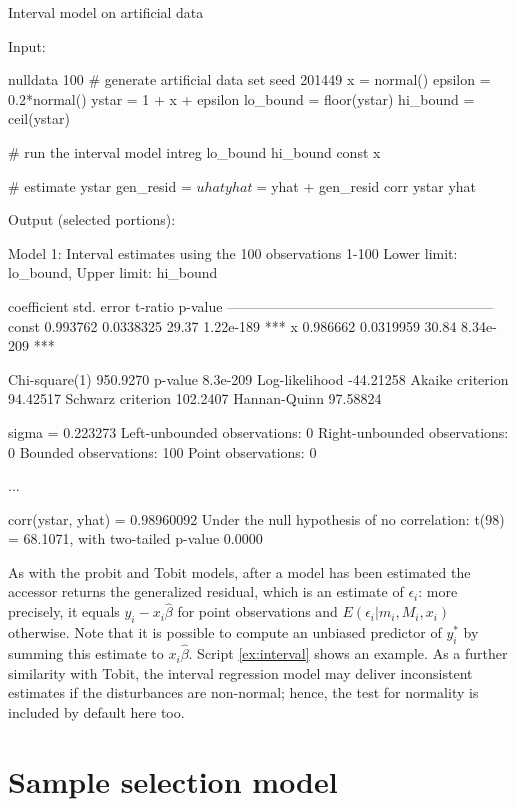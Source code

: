 \begin{script}[ht]
  \caption{Interval model on artificial data}
  \label{ex:interval}
Input:
\begin{scodebit}
nulldata 100
# generate artificial data
set seed 201449 
x = normal()
epsilon = 0.2*normal()
ystar = 1 + x + epsilon
lo_bound = floor(ystar)
hi_bound = ceil(ystar)

# run the interval model
intreg lo_bound hi_bound const x

# estimate ystar
gen_resid = $uhat
yhat = $yhat + gen_resid
corr ystar yhat 
\end{scodebit}
Output (selected portions):
\begin{scodebit}
Model 1: Interval estimates using the 100 observations 1-100
Lower limit: lo_bound, Upper limit: hi_bound

             coefficient   std. error   t-ratio    p-value 
  ---------------------------------------------------------
  const       0.993762     0.0338325     29.37    1.22e-189 ***
  x           0.986662     0.0319959     30.84    8.34e-209 ***

Chi-square(1)        950.9270   p-value              8.3e-209
Log-likelihood      -44.21258   Akaike criterion     94.42517
Schwarz criterion    102.2407   Hannan-Quinn         97.58824

sigma = 0.223273
Left-unbounded observations: 0
Right-unbounded observations: 0
Bounded observations: 100
Point observations: 0

...

corr(ystar, yhat) = 0.98960092
Under the null hypothesis of no correlation:
 t(98) = 68.1071, with two-tailed p-value 0.0000
\end{scodebit}
\end{script}

As with the probit and Tobit models, after a model has been estimated
the  accessor returns the generalized residual, which is
an estimate of $\epsilon_i$: more precisely, it equals $y_i - x_i
\hat{\beta}$ for point observations and $E(\epsilon_i| m_i, M_i, x_i)$
otherwise. Note that it is possible to compute an unbiased predictor
of $y^*_i$ by summing this estimate to $x_i \hat{\beta}$. Script
\ref{ex:interval} shows an example. As a further similarity with
Tobit, the interval regression model may deliver inconsistent
estimates if the disturbances are non-normal; hence, the
\cite{chesher-irish87} test for normality is included by default here
too.


\section{Sample selection model}
\label{sec:heckit}

